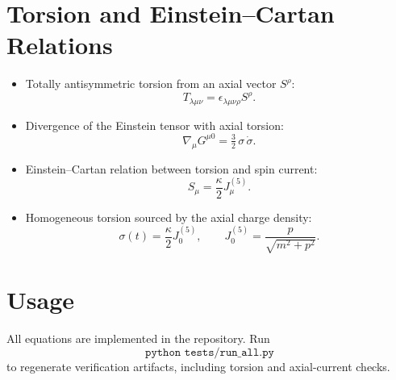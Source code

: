 \documentclass[11pt]{article}
\begin{document}
\section*{Torsion and Einstein--Cartan Relations}
\begin{itemize}
    \item Totally antisymmetric torsion from an axial vector $S^\rho$:
    \[
    T_{\lambda\mu\nu} = \epsilon_{\lambda\mu\nu\rho} S^\rho.
    \]
    \item Divergence of the Einstein tensor with axial torsion:
    \[
    \nabla_\mu G^{\mu 0} = \tfrac{3}{2}\,\sigma\,\dot{\sigma}.
    \]
    \item Einstein--Cartan relation between torsion and spin current:
    \[
    S_\mu = \frac{\kappa}{2} J_\mu^{(5)}.
    \]
    \item Homogeneous torsion sourced by the axial charge density:
    \[
    \sigma(t) = \frac{\kappa}{2} J_0^{(5)}, \qquad
    J_0^{(5)} = \frac{p}{\sqrt{m^2 + p^2}}.
    \]
\end{itemize}

\section*{Usage}
All equations are implemented in the repository. Run
\[
\texttt{python tests/run\_all.py}
\]
to regenerate verification artifacts, including torsion and axial-current checks.
\end{document}
